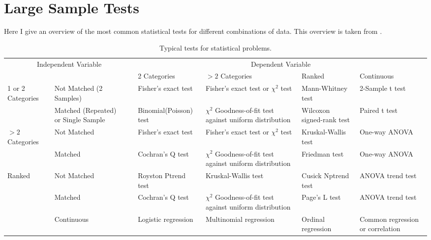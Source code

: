 \section{ Large Sample Tests }

Here I give an overview of the most common statistical tests for different combinations of data. This overview is taken from \cite{Riffenburgh2012}.
\begin{table}
  \centering
  \footnotesize{
  \begin{tabular}{ p{2cm} p{2cm} l | p{2.5cm} p{3cm} p{2.5cm} p{3cm} }
     \multicolumn{3}{c}{Independent Variable}  & \multicolumn{4}{c}{Dependent Variable} \\
     & & & 2 Categories & $>2$ Categories & Ranked & Continuous \\
     \hline
     \multirow{2}{*}{1 or 2 Categories} & Not Matched (2 Samples) & & Fisher's exact test & Fisher's exact test or $\chi^2$ test & Mann-Whitney test & 2-Sample t test \\
     & Matched (Repeated) or Single Sample & & Binomial(Poisson) test & $\chi^2$ Goodness-of-fit test against uniform distribution & Wilcoxon signed-rank test & Paired t test \\

     \hline
     \multirow{2}{*}{$>2$ Categories} & Not Matched& & Fisher's exact test & Fisher's exact test or $\chi^2$ test & Kruskal-Wallis test & One-way ANOVA\\
     & Matched & & Cochran's Q test & $\chi^2$ Goodness-of-fit test against uniform distribution  & Friedman test & One-way ANOVA \\

     \hline
     \multirow{2}{*}{Ranked} & Not Matched & & Royston Ptrend test & Kruskal-Wallis test & Cusick Nptrend test & ANOVA trend test \\

     & Matched & & Cochran's Q test & $\chi^2$ Goodness-of-fit test against uniform distribution  & Page's L test & ANOVA trend test \\
     & Continuous & & Logistic regression & Multinomial regression & Ordinal regression & Common regression or correlation \\

  \end{tabular}
  }

  \caption{Typical tests for statistical problems.}\label{table:tests}
\end{table}

